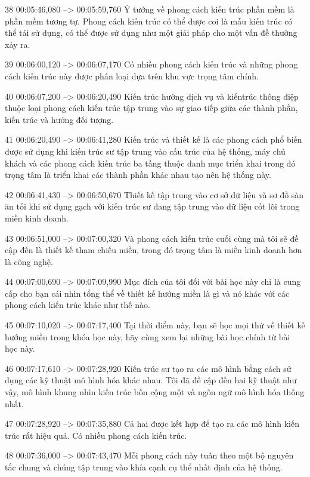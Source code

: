 38
00:05:46,080 --> 00:05:59,760
Ý tưởng về phong cách kiến ​​trúc phần mềm là phần mềm tương tự.  Phong cách kiến ​​trúc có thể được coi là mẫu kiến ​​trúc có thể tái sử dụng, có thể được sử dụng như một giải pháp cho một vấn đề thường xảy ra.

39
00:06:00,120 --> 00:06:07,170
Có nhiều phong cách kiến ​​trúc và những phong cách kiến ​​trúc này được phân loại dựa trên khu vực trọng tâm chính.

40
00:06:07,200 --> 00:06:20,490
Kiến trúc hướng dịch vụ và kiến ​​trúc thông điệp thuộc loại phong cách kiến ​​trúc tập trung vào sự giao tiếp giữa các thành phần, kiến ​​trúc và hướng đối tượng.

41
00:06:20,490 --> 00:06:41,280
Kiến trúc và thiết kế là các phong cách phổ biến được sử dụng khi kiến ​​trúc sư tập trung vào cấu trúc của hệ thống, máy chủ khách và các phong cách kiến ​​trúc ba tầng thuộc danh mục triển khai trong đó trọng tâm là triển khai các thành phần khác nhau tạo nên  hệ thống này.

42
00:06:41,430 --> 00:06:50,670
Thiết kế tập trung vào cơ sở dữ liệu và sơ đồ sàn ăn tối khi sử dụng gạch với kiến ​​trúc sư đang tập trung vào dữ liệu cốt lõi trong miền kinh doanh.

43
00:06:51,000 --> 00:07:00,320
Và phong cách kiến ​​trúc cuối cùng mà tôi sẽ đề cập đến là thiết kế tham chiếu miền, trong đó trọng tâm là miền kinh doanh hơn là công nghệ.

44
00:07:00,690 --> 00:07:09,990
Mục đích của tôi đối với bài học này chỉ là cung cấp cho bạn cái nhìn tổng thể về thiết kế hướng miền là gì và nó khác với các phong cách kiến ​​trúc khác như thế nào.

45
00:07:10,020 --> 00:07:17,400
Tại thời điểm này, bạn sẽ học mọi thứ về thiết kế hướng miền trong khóa học này, hãy cùng xem lại những bài học chính từ bài học này.

46
00:07:17,610 --> 00:07:28,920
Kiến trúc sư tạo ra các mô hình bằng cách sử dụng các kỹ thuật mô hình hóa khác nhau.  Tôi đã đề cập đến hai kỹ thuật như vậy, mô hình khung nhìn kiến ​​trúc bốn cộng một và ngôn ngữ mô hình hóa thống nhất.

47
00:07:28,920 --> 00:07:35,880
Cả hai được kết hợp để tạo ra các mô hình kiến ​​trúc rất hiệu quả.  Có nhiều phong cách kiến ​​trúc.

48
00:07:36,000 --> 00:07:43,470
Mỗi phong cách này tuân theo một bộ nguyên tắc chung và chúng tập trung vào khía cạnh cụ thể nhất định của hệ thống.

